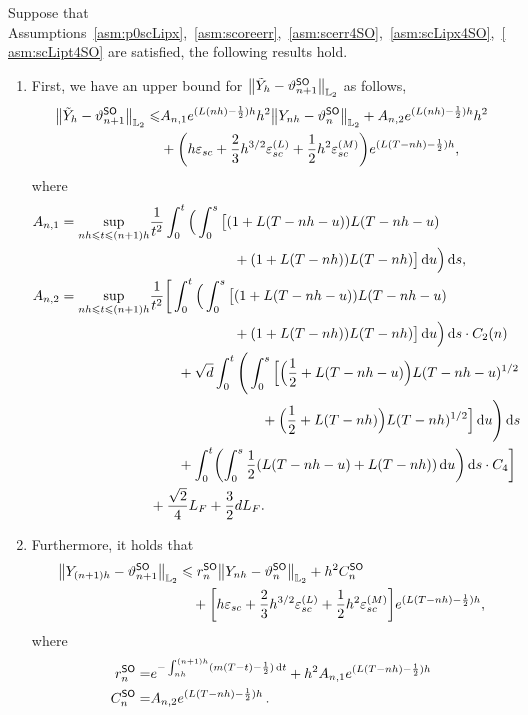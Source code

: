 \begin{proposition}
    \label{prop:2order}
    Suppose that Assumptions~\ref{asm:p0scLipx},~\ref{asm:scoreerr},~\ref{asm:scerr4SO},~\ref{asm:scLipx4SO},~\ref{asm:scLipt4SO} are satisfied, the following results hold. 
    \begin{enumerate}[label=\textbf{(\arabic*)}, leftmargin=2em]
        \item \label{item:SOtilde}
        First, we have an upper bound for $\l|\tilde Y_h-\vartheta_{n+1}^{\sf SO}\r|_{\Ltwo}$ as follows,
        \begin{align*}
            \l|\tilde{Y}_h-\vartheta_{n+1}^{\sf SO}\r|_{\Ltwo}\leqslant&A_{n,1}e^{(L(nh)-\frac{1}{2})h}h^2\l|Y_{nh}-\vartheta_n^{\sf SO}\r|_{\Ltwo}+A_{n,2}e^{(L(nh)-\frac{1}{2})h}h^2\\
            &+\left(h\varepsilon_{sc}+\dfrac{2}{3}h^{3/2}\varepsilon_{sc}^{(L)}+\dfrac{1}{2}h^2\varepsilon_{sc}^{(M)}\right)e^{(L(T-nh)-\frac{1}{2})h},
        \end{align*}
        where
        \begin{align*}
            A_{n,1}=\sup_{nh\leqslant t\leqslant (n+1)h}&\dfrac{1}{t^2}\int_0^t\Big(\int_0^s\big[(1+L(T-nh-u))L(T-nh-u)\\
            &\qquad \qquad\qquad+(1+L(T-nh))L(T-nh)\big]\rmd u\Big)\rmd s,\\
            A_{n,2}=\sup_{nh\leqslant t\leqslant (n+1)h}&\dfrac{1}{t^2}\bigg[\int_0^t\Big(\int_0^s\big[(1+L(T-nh-u))L(T-nh-u)\\
            &\qquad \qquad\qquad+(1+L(T-nh))L(T-nh)\big]\rmd u\Big)\rmd s\cdot C_2(n)\\
            &\qquad+\sqrt{d}\int_0^t\Bigg(\int_0^s\Big[\Big(\dfrac{1}{2}+L(T-nh-u)\Big)L(T-nh-u)^{1/2}\\
            &\qquad\qquad \qquad\qquad+\Big(\dfrac{1}{2}+L(T-nh)\Big)L(T-nh)^{1/2}\Big]\rmd u\Bigg)\rmd s\\
            &\qquad+\int_0^t\left(\int_0^s\dfrac{1}{2}(L(T-nh-u)+L(T-nh))\rmd u\right)\rmd s\cdot C_4\bigg]\\
            &+\dfrac{\sqrt{2}}{4}L_F+\dfrac{3}{2}dL_F.
        \end{align*}
        \item \label{item:SOYt}
        Furthermore, it holds that
        \begin{align*}
            \l|Y_{(n+1)h}-\vartheta_{n+1}^{\sf SO}\r|_{\Ltwo}
            &\leqslant r_n^{\sf SO}\l|Y_{nh}-\vartheta_n^{\sf SO}\r|_{\Ltwo}+h^2C_n^{\sf SO}\\
            &\quad +\left[h\varepsilon_{sc}+\dfrac{2}{3}h^{3/2}\varepsilon_{sc}^{(L)}+\dfrac{1}{2}h^2\varepsilon_{sc}^{(M)}\right]e^{(L(T-nh)-\frac{1}{2})h},
        \end{align*}
        where
        \begin{align*}
            r_n^{\sf SO}=&e^{-\int_{nh}^{(n+1)h}(m(T-t)-\frac{1}{2}){\,\rm d} t}+h^2A_{n,1}e^{(L(T-nh)-\frac{1}{2})h}\\
            C_n^{\sf SO}=&A_{n,2}e^{(L(T-nh)-\frac{1}{2})h}\,.
        \end{align*}
    \end{enumerate}
\end{proposition}
